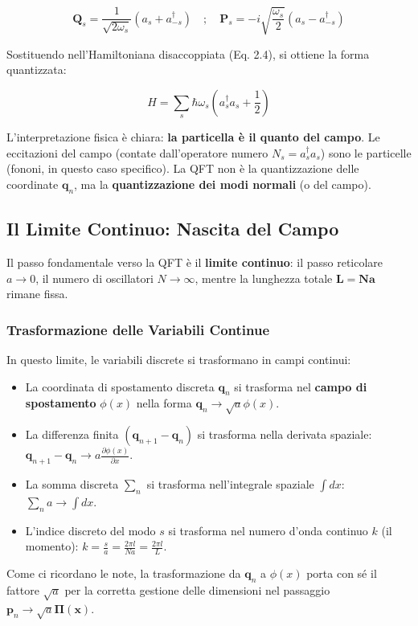 \begin{equation}
\mathbf{Q}_s = \frac{1}{\sqrt{2\omega_s}} (a_s + a_{-s}^{\dagger}) \quad ; \quad \mathbf{P}_s = -i\sqrt{\frac{\omega_s}{2}} (a_s - a_{-s}^{\dagger})
\end{equation}

Sostituendo nell'Hamiltoniana disaccoppiata (Eq. 2.4), si ottiene la forma quantizzata:

\begin{equation}
H = \sum_{s} \hbar\omega_s \left( a_s^{\dagger} a_s + \frac{1}{2} \right)
\end{equation}

L'interpretazione fisica è chiara: \textbf{la particella è il quanto del campo}. Le eccitazioni del campo (contate dall'operatore numero $N_s = a_s^{\dagger} a_s$) sono le particelle (fononi, in questo caso specifico). La QFT non è la quantizzazione delle coordinate $\mathbf{q}_n$, ma la \textbf{quantizzazione dei modi normali} (o del campo).

\subsection{Il Limite Continuo: Nascita del Campo}

Il passo fondamentale verso la QFT è il \textbf{limite continuo}: il passo reticolare $a \to 0$, il numero di oscillatori $N \to \infty$, mentre la lunghezza totale $\mathbf{L=Na}$ rimane fissa.

\subsubsection{Trasformazione delle Variabili Continue}

In questo limite, le variabili discrete si trasformano in campi continui:
\begin{itemize}
    \item La coordinata di spostamento discreta $\mathbf{q}_n$ si trasforma nel \textbf{campo di spostamento} $\phi(x)$ nella forma $\mathbf{q}_n \to \sqrt{a} \phi(x)$.
    \item La differenza finita $(\mathbf{q}_{n+1} - \mathbf{q}_n)$ si trasforma nella derivata spaziale: $\mathbf{q}_{n+1} - \mathbf{q}_n \to a \frac{\partial \phi(x)}{\partial x}$.
    \item La somma discreta $\sum_n$ si trasforma nell'integrale spaziale $\int dx$: $\sum_n a \to \int dx$.
    \item L'indice discreto del modo $s$ si trasforma nel numero d'onda continuo $k$ (il momento): $k = \frac{s}{a} = \frac{2\pi l}{Na} = \frac{2\pi l}{L}$.
\end{itemize}
Come ci ricordano le note, la trasformazione da $\mathbf{q}_n$ a $\phi(x)$ porta con sé il fattore $\sqrt{a}$ per la corretta gestione delle dimensioni nel passaggio $\mathbf{p}_n \to \sqrt{a}\mathbf{\Pi(x)}$.

